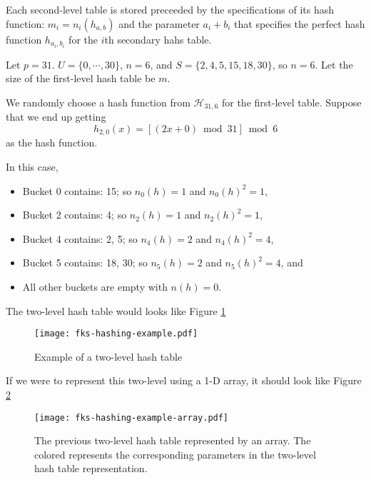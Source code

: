 Each second-level table is stored preceeded by the specifications of its hash function: $m_i = n_{i}(h_{a,b})$ and the parameter $a_i + b_i$ that specifies the perfect hash function $h_{a_i,b_i}$ for the $i$th secondary hahs table.

\begin{example}
    Let $p=31$. $U= \{0,\cdots,30\}$, $n=6$, and $S= \{2,4,5,15,18,30\}$, so $n=6$. Let the size of the first-level hash table be $m$.

    We randomly choose a hash function from $\mathcal{H}_{31,6}$ for the first-level table. Suppose that we end up getting
    $$
    h_{2,0}(x) = [(2x+0) \bmod 31] \bmod 6
    $$
    as the hash function.

    In this case,
    \begin{itemize}
        \item Bucket 0 contains: 15; so $n_0(h)=1$ and  $n_0(h)^2=1$,
        \item Bucket 2 contains: 4; so $n_2(h)=1$ and $n_2(h)^2=1$,
        \item Bucket 4 contains: 2, 5; so $n_4(h)=2$ and $n_4(h)^2=4$,
        \item Bucket 5 contains: 18, 30; so $n_5(h)=2$ and $n_5(h)^2=4$, and
        \item All other buckets are empty with $n(h) = 0$.
    \end{itemize}

    The two-level hash table would looks like Figure \ref{fig:fks-hashing-example}
    \begin{figure}[htbp]
        \centering
        \texttt{[image: fks-hashing-example.pdf]}
        \caption{Example of a two-level hash table}
        \label{fig:fks-hashing-example}
    \end{figure}

    If we were to represent this two-level using a 1-D array, it should look like Figure \ref{fig:fks-hashing-example-array}
    \begin{figure}[htbp]
        \centering
        \texttt{[image: fks-hashing-example-array.pdf]}
        \caption{The previous two-level hash table represented by an array. The colored represents the corresponding parameters in the two-level hash table representation.}
        \label{fig:fks-hashing-example-array}
    \end{figure}
\end{example}

\pagebreak

